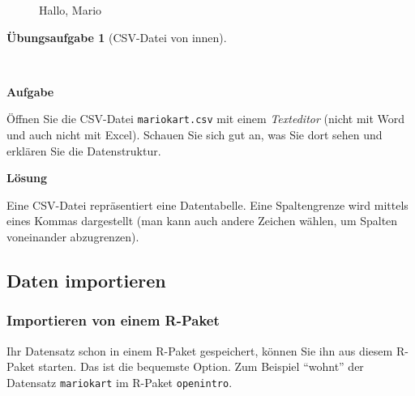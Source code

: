 \documentclass[
  letterpaper,
]{scrbook}
\theoremstyle{definition}
\theoremstyle{definition}
\theoremstyle{definition}
\newtheorem{exercise}{Übungsaufgabe}[chapter]
\theoremstyle{remark}
\begin{document}
\begin{figure}


\caption{\label{fig-mario}Hallo, Mario}

\end{figure}%

\begin{exercise}[CSV-Datei von
innen]\protect\hypertarget{exr-texteditor}{}\label{exr-texteditor}

~

\textbf{Aufgabe}

Öffnen Sie die CSV-Datei \texttt{mariokart.csv} mit einem
\emph{Texteditor} (nicht mit Word und auch nicht mit Excel). Schauen Sie
sich gut an, was Sie dort sehen und erklären Sie die Datenstruktur.

\textbf{Lösung}

Eine CSV-Datei repräsentiert eine Datentabelle. Eine Spaltengrenze wird
mittels eines Kommas dargestellt (man kann auch andere Zeichen wählen,
um Spalten voneinander abzugrenzen).

\end{exercise}

\subsection{Daten importieren}\label{daten-importieren}

\subsubsection{Importieren von einem
R-Paket}\label{importieren-von-einem-r-paket}

Ihr Datensatz schon in einem R-Paket gespeichert, können Sie ihn aus
diesem R-Paket starten. Das ist die bequemste Option. Zum Beispiel
``wohnt'' der Datensatz \texttt{mariokart} im R-Paket
\texttt{openintro}.
\end{document}
